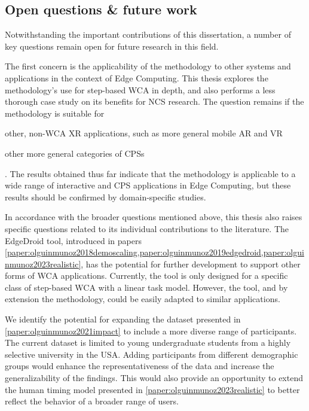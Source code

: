 \subsection{Open questions \& future work}

Notwithstanding the important contributions of this dissertation, a number of key questions remain open for future research in this field.

The first concern is the applicability of the methodology to other systems and applications in the context of Edge Computing.
This thesis explores the methodology's use for step-based \gls{WCA} in depth, and also performs a less thorough case study on its benefits for \gls{NCS} research.
The question remains if the methodology is suitable for
\begin{inlineenum}
    \item other, non-\gls{WCA} \gls{XR} applications, such as more general mobile \gls{AR} and \gls{VR}
    \item other more general categories of \glspl{CPS}
\end{inlineenum}.
The results obtained thus far indicate that the methodology is applicable to a wide range of interactive and \gls{CPS} applications in Edge Computing, but these results should be confirmed by domain-specific studies.

In accordance with the broader questions mentioned above, this thesis also raises specific questions related to its individual contributions to the literature.
The EdgeDroid tool, introduced in papers \cref{paper:olguinmunoz2018demoscaling,paper:olguinmunoz2019edgedroid,paper:olguinmunoz2023realistic}, has the potential for further development to support other forms of \gls{WCA} applications.
Currently, the tool is only designed for a specific class of step-based \gls{WCA} with a linear task model.
However, the tool, and by extension the methodology, could be easily adapted to similar applications.

We identify the potential for expanding the dataset presented in \cref{paper:olguinmunoz2021impact} to include a more diverse range of participants.
The current dataset is limited to young undergraduate students from a highly selective university in the \gls{USA}.
Adding participants from different demographic groups would enhance the representativeness of the data and increase the generalizability of the findings.
This would also provide an opportunity to extend the human timing model presented in \cref{paper:olguinmunoz2023realistic} to better reflect the behavior of a broader range of users.

